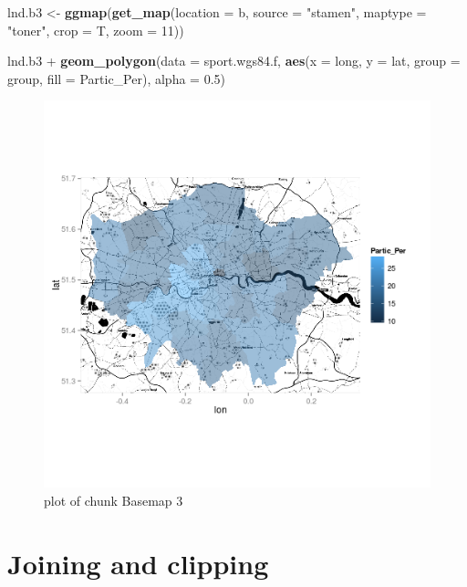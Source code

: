 \documentclass[]{article}
\makeatletter
\newenvironment{Shaded}{}{}
\newcommand{\KeywordTok}[1]{\textcolor[rgb]{0.00,0.44,0.13}{\textbf{{#1}}}}
\newcommand{\DataTypeTok}[1]{\textcolor[rgb]{0.56,0.13,0.00}{{#1}}}
\newcommand{\DecValTok}[1]{\textcolor[rgb]{0.25,0.63,0.44}{{#1}}}
\newcommand{\FloatTok}[1]{\textcolor[rgb]{0.25,0.63,0.44}{{#1}}}
\newcommand{\StringTok}[1]{\textcolor[rgb]{0.25,0.44,0.63}{{#1}}}
\newcommand{\NormalTok}[1]{{#1}}
\def\maxwidth{\ifdim\Gin@nat@width>\linewidth\linewidth
\else\Gin@nat@width\fi}
\let\Oldincludegraphics\includegraphics
\renewcommand{\includegraphics}[1]{\Oldincludegraphics[width=\maxwidth]{#1}}
\makeatother
\begin{document}
\begin{Shaded}
\begin{Highlighting}[]
\NormalTok{lnd.b3 <- }\KeywordTok{ggmap}\NormalTok{(}\KeywordTok{get_map}\NormalTok{(}\DataTypeTok{location =} \NormalTok{b, }\DataTypeTok{source =} \StringTok{"stamen"}\NormalTok{, }\DataTypeTok{maptype =} \StringTok{"toner"}\NormalTok{, }
    \DataTypeTok{crop =} \NormalTok{T, }\DataTypeTok{zoom =} \DecValTok{11}\NormalTok{))}

\NormalTok{lnd.b3 + }\KeywordTok{geom_polygon}\NormalTok{(}\DataTypeTok{data =} \NormalTok{sport.wgs84.f, }\KeywordTok{aes}\NormalTok{(}\DataTypeTok{x =} \NormalTok{long, }\DataTypeTok{y =} \NormalTok{lat, }\DataTypeTok{group =} \NormalTok{group, }
    \DataTypeTok{fill =} \NormalTok{Partic_Per), }\DataTypeTok{alpha =} \FloatTok{0.5}\NormalTok{)}
\end{Highlighting}
\end{Shaded}
\begin{figure}[htbp]
\centering
\includegraphics{figure/Basemap_3.png}
\caption{plot of chunk Basemap 3}
\end{figure}

\section{Joining and clipping}
\end{document}
